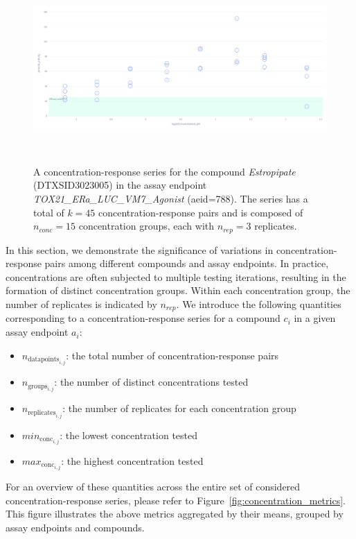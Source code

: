 \begin{figure}[htbp]  %
    \centering
    \includegraphics[width=1.0\textwidth]{figures/concentration_response_series.png}  
    \caption{A concentration-response series for the compound \textit{Estropipate} (DTXSID3023005) in the assay endpoint \textit{TOX21\_ERa\_LUC\_VM7\_Agonist} (aeid=788). The series has a total of $k = 45$ concentration-response pairs and is composed of $n_{conc} = 15$ concentration groups, each with $n_{rep} = 3$ replicates.}
~\label{fig:concentration_response_series} 
\end{figure}

In this section, we demonstrate the significance of variations in concentration-response pairs among different compounds and assay endpoints. In practice, concentrations are often subjected to multiple testing iterations, resulting in the formation of distinct concentration groups. Within each concentration group, the number of replicates is indicated by $n_{rep}$.
We introduce the following quantities corresponding to a concentration-response series for a compound $c_i$ in a given assay endpoint $a_i$:
\begin{itemize}
    \item $n_{\text{datapoints}_{i,j}}$: the total number of concentration-response pairs
    \item $n_{\text{groups}_{i,j}}$: the number of distinct concentrations tested
    \item $n_{\text{replicates}_{i,j}}$: the number of replicates for each concentration group
    \item $min_{\text{conc}_{i,j}}$: the lowest concentration tested
    \item $max_{\text{conc}_{i,j}}$: the highest concentration tested
\end{itemize}


For an overview of these quantities across the entire set of considered concentration-response series, please refer to Figure~\ref{fig:concentration_metrics}. This figure illustrates the above metrics aggregated by their means, grouped by assay endpoints and compounds.



